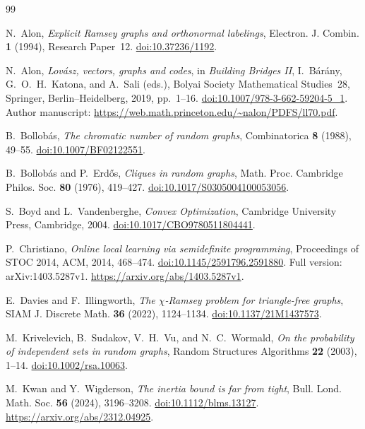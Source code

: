 \documentclass[11pt]{article}
\numberwithin{equation}{section}
\theoremstyle{definition}
\theoremstyle{remark}
\begin{document}
\begin{thebibliography}{99}

N.~Alon,
\emph{Explicit Ramsey graphs and orthonormal labelings},
Electron. J. Combin. \textbf{1} (1994), Research Paper~12.
\href{https://doi.org/10.37236/1192}{doi:10.37236/1192}.

N.~Alon,
\emph{Lov\'asz, vectors, graphs and codes},
in \emph{Building Bridges II}, I.~B\'ar\'any, G.~O.~H.~Katona,
and A.~Sali (eds.), Bolyai Society Mathematical Studies~28,
Springer, Berlin--Heidelberg, 2019, pp.~1--16.
\href{https://doi.org/10.1007/978-3-662-59204-5_1}
{doi:10.1007/978-3-662-59204-5\_1}.
Author manuscript:
\url{https://web.math.princeton.edu/~nalon/PDFS/ll70.pdf}.

B.~Bollob\'as,
\emph{The chromatic number of random graphs},
Combinatorica \textbf{8} (1988), 49--55.
\href{https://doi.org/10.1007/BF02122551}{doi:10.1007/BF02122551}.

B.~Bollob\'as and P.~Erd\H{o}s,
\emph{Cliques in random graphs},
Math. Proc. Cambridge Philos. Soc. \textbf{80} (1976), 419--427.
\href{https://doi.org/10.1017/S0305004100053056}
{doi:10.1017/S0305004100053056}.

S.~Boyd and L.~Vandenberghe,
\emph{Convex Optimization},
Cambridge University Press, Cambridge, 2004.
\href{https://doi.org/10.1017/CBO9780511804441}
{doi:10.1017/CBO9780511804441}.

P.~Christiano,
\emph{Online local learning via semidefinite programming},
Proceedings of STOC 2014, ACM, 2014, 468--474.
\href{https://doi.org/10.1145/2591796.2591880}
{doi:10.1145/2591796.2591880}.
Full version: arXiv:1403.5287v1.
\url{https://arxiv.org/abs/1403.5287v1}.

E.~Davies and F.~Illingworth,
\emph{The $\chi$-Ramsey problem for triangle-free graphs},
SIAM J. Discrete Math. \textbf{36} (2022), 1124--1134.
\href{https://doi.org/10.1137/21M1437573}
{doi:10.1137/21M1437573}.

M.~Krivelevich, B.~Sudakov, V.~H.~Vu, and N.~C.~Wormald,
\emph{On the probability of independent sets in random graphs},
Random Structures Algorithms \textbf{22} (2003), 1--14.
\href{https://doi.org/10.1002/rsa.10063}{doi:10.1002/rsa.10063}.

M.~Kwan and Y.~Wigderson,
\emph{The inertia bound is far from tight},
Bull. Lond. Math. Soc. \textbf{56} (2024), 3196--3208.
\href{https://doi.org/10.1112/blms.13127}{doi:10.1112/blms.13127}.
\url{https://arxiv.org/abs/2312.04925}.


\end{thebibliography}
\end{document}
